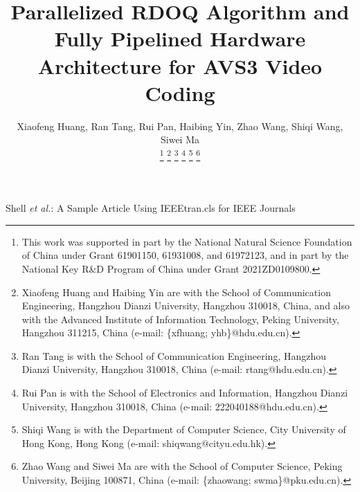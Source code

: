 \documentclass[lettersize,journal]{IEEEtran}
\begin{document}
\title{Parallelized RDOQ Algorithm and Fully Pipelined Hardware Architecture for AVS3 Video Coding}

\author{Xiaofeng Huang, Ran Tang, Rui Pan, Haibing Yin, Zhao Wang, Shiqi Wang, Siwei Ma

\thanks{This work was supported in part by the National Natural Science Foundation of China under Grant 61901150, 61931008, and 61972123, and in part by the National Key R\&D Program of China under Grant 2021ZD0109800.}%
\thanks{Xiaofeng Huang and Haibing Yin are with the School of Communication Engineering, Hangzhou Dianzi University, Hangzhou 310018, China, and also with the Advanced Institute of Information Technology, Peking University, Hangzhou 311215, China (e-mail: \{xfhuang; yhb\}@hdu.edu.cn).}
\thanks{Ran Tang is with the School of Communication Engineering, Hangzhou Dianzi University,
Hangzhou 310018, China (e-mail: rtang@hdu.edu.cn).}
\thanks{Rui Pan is with the School of Electronics and Information, Hangzhou Dianzi University, Hangzhou 310018, China (e-mail: 222040188@hdu.edu.cn).}
\thanks{Shiqi Wang is with the Department of Computer Science, City University of Hong Kong, Hong Kong (e-mail: shiqwang@cityu.edu.hk).}
\thanks{Zhao Wang and Siwei Ma are with the School of Computer Science, Peking University, Beijing 100871, China (e-mail: \{zhaowang; swma\}@pku.edu.cn).}

}

%
{Shell \MakeLowercase{\textit{et al.}}: A Sample Article Using IEEEtran.cls for IEEE Journals}


\maketitle
\end{document}
